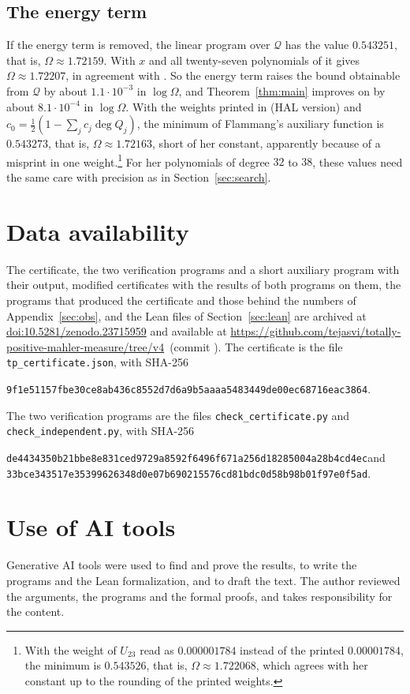 \documentclass[11pt]{amsart}
\theoremstyle{remark}
\numberwithin{equation}{section}
\newcommand{\NoEnergyVal}{0.543251}
\newcommand{\NoEnergyOmega}{1.72159}
\newcommand{\CertFile}{tp\_certificate.json}
\newcommand{\CertSha}{9f1e51157fbe30ce8ab436c8552d7d6a9b5aaaa5483449de00ec68716eac3864}
\newcommand{\ShaChkA}{de4434350b21bbe8e831ced9729a8592f6496f671a256d18285004a28b4cd4ec}
\newcommand{\ShaChkB}{33bce343517e35399626348d0e07b690215576cd81bdc0d58b98b01f97e0f5ad}
\newcommand{\SuppDOI}{10.5281/zenodo.23715959}
\def\RepoCommit{}
\newcommand{\RepoLink}{\url{https://github.com/tejasvi/totally-positive-mahler-measure/tree/v4}\ifx\RepoCommit\empty\else\ (commit \texttt{\RepoCommit})\fi}
\begin{document}
\subsection{The energy term}\label{sec:energy}
If the energy term is removed, the linear program over $\mathcal Q$ has the value $\NoEnergyVal$, that is, $\Omega\approx\NoEnergyOmega$. With $x$ and all twenty-seven polynomials of \cite[Table~1]{Fla15} it gives $\Omega\approx1.72207$, in agreement with \cite[Theorem~1]{Fla15}. So the energy term raises the bound obtainable from $\mathcal Q$ by about $1.1\cdot10^{-3}$ in $\log\Omega$, and Theorem~\ref{thm:main} improves on \cite{Fla15} by about $8.1\cdot10^{-4}$ in $\log\Omega$. With the weights printed in \cite[Table~1]{Fla15} (HAL version) and $c_0=\frac12(1-\sum_jc_j\deg Q_j)$, the minimum of Flammang's auxiliary function is $0.543273$, that is, $\Omega\approx1.72163$, short of her constant, apparently because of a misprint in one weight.\footnote{With the weight of $U_{23}$ read as $0.000001784$ instead of the printed $0.00001784$, the minimum is $0.543526$, that is, $\Omega\approx1.722068$, which agrees with her constant up to the rounding of the printed weights.} For her polynomials of degree $32$ to $38$, these values need the same care with precision as in Section~\ref{sec:search}.



\FloatBarrier
\section*{Data availability}
The certificate, the two verification programs and a short auxiliary program with their output, modified certificates with the results of both programs on them, the programs that produced the certificate and those behind the numbers of Appendix~\ref{sec:obs}, and the Lean files of Section~\ref{sec:lean} are archived at \href{https://doi.org/\SuppDOI}{doi:\SuppDOI} and available at \RepoLink. The certificate is the file \texttt{\CertFile}, with SHA-256
\begin{center}\small\texttt{\CertSha}.\end{center}
The two verification programs are the files \texttt{check\_certificate.py} and \texttt{check\_independent.py}, with SHA-256
\begin{center}\small\texttt{\ShaChkA}\quad and\\ \texttt{\ShaChkB}.\end{center}

\section*{Use of AI tools}
Generative AI tools were used to find and prove the results, to write the programs and the Lean formalization, and to draft the text. The author reviewed the arguments, the programs and the formal proofs, and takes responsibility for the content.
\end{document}
